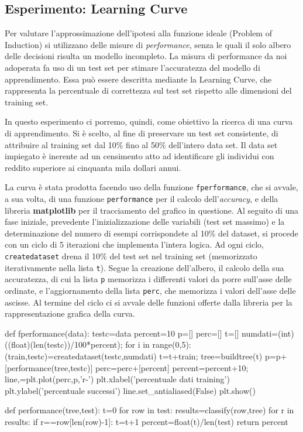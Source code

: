 		\subsection{Esperimento: Learning Curve}
			Per valutare l'approssimazione dell'ipotesi alla funzione ideale (\textsf{Problem of Induction}) si utilizzano delle misure di \emph{performance}, senza le quali il solo albero delle decisioni risulta un modello incompleto. La misura di performance da noi adoperata fa uso di un test set per stimare l'accuratezza del modello di apprendimento. Essa può essere descritta mediante la \textsf{Learning Curve}, che rappresenta la percentuale di correttezza sul test set rispetto alle dimensioni del training set.\par
			In questo esperimento ci porremo, quindi, come obiettivo la ricerca di una curva di apprendimento. Si è scelto, al fine di preservare un test set consistente, di attribuire al training set dal 10\% fino al 50\% dell'intero data set.
			Il data set impiegato è inerente ad un censimento atto ad identificare gli individui con reddito superiore ai cinquanta mila dollari annui.\par
			La curva è stata prodotta facendo uso della funzione \texttt{fperformance}, che si avvale, a sua volta, di una funzione \texttt{performance} per il calcolo dell'\emph{accuracy}, e della libreria \textbf{matplotlib} per il tracciamento del grafico in questione. Al seguito di una fase iniziale, prevedente l'inizializzazione delle variabili (test set massimo) e la determinazione del numero di esempi corrispondete al 10\% del dataset, si procede con un ciclo di 5 iterazioni che implementa l'intera logica. Ad ogni ciclo, \texttt{createdataset} drena il 10\% del test set nel training set (memorizzato iterativamente nella lista \texttt{t}). Segue la creazione dell'albero, il calcolo della sua accuratezza, di cui la lista \texttt{p} memorizza i differenti valori da porre sull'asse delle ordinate, e l'aggiornamento della lista \texttt{perc}, che memorizza i valori dell'asse delle ascisse. Al termine del ciclo ci si avvale delle funzioni offerte dalla libreria per la rappresentazione grafica della curva.
			\bigskip
			\begin{python}
		def fperformance(data):
			testc=data
			percent=10
			p=[]
			perc=[]
			t=[]
			numdati=(int)((float)(len(testc))/100*percent);
			for i in range(0,5):
				(train,testc)=createdataset(testc,numdati)
				t=t+train;
				tree=buildtree(t)
				p=p+[performance(tree,testc)]
				perc=perc+[percent]
				percent=percent+10;
			line,=plt.plot(perc,p,'r-')
			plt.xlabel('percentuale dati training')
			plt.ylabel('percentuale successi')
			line.set_antialiased(False)
			plt.show()
			
			
		def performance(tree,test):
			t=0
			for row in test:
				results=classify(row,tree)
				for r in results:
					if r==row[len(row)-1]:
						t=t+1
			percent=float(t)/len(test)
			return percent
			\end{python}
			\bigskip
		
